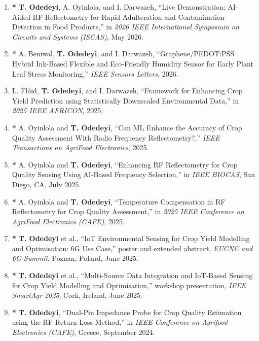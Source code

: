 \documentclass[a4paper,11pt]{article}
\begin{document}
\begin{enumerate}[leftmargin=*]

\item \textbf{*} \textbf{T. Odedeyi}, A. Oyinlola, and I. Darwazeh, ``Live Demonstration: AI-Aided RF Reflectometry for Rapid Adulteration and Contamination Detection in Food Products,'' in \emph{2026 IEEE International Symposium on Circuits and Systems (ISCAS)}, May 2026.

\item \textbf{*} A. Beniwal, \textbf{T. Odedeyi}, and I. Darwazeh, ``Graphene/PEDOT:PSS Hybrid Ink-Based Flexible and Eco-Friendly Humidity Sensor for Early Plant Leaf Stress Monitoring,'' \emph{IEEE Sensors Letters}, 2026.

\item L. Fl\'oid, \textbf{T. Odedeyi}, and I. Darwazeh, ``Framework for Enhancing Crop Yield Prediction using Statistically Downscaled Environmental Data,'' in \emph{2025 IEEE AFRICON}, 2025.

\item \textbf{*} A. Oyinlola and \textbf{T. Odedeyi}, ``Can ML Enhance the Accuracy of Crop Quality Assessment With Radio Frequency Reflectometry?,'' \emph{IEEE Transactions on AgriFood Electronics}, 2025.

\item \textbf{*} A. Oyinlola and \textbf{T. Odedeyi}, ``Enhancing RF Reflectometry for Crop Quality Sensing Using AI-Based Frequency Selection,'' in \emph{IEEE BIOCAS}, San Diego, CA, July 2025.

\item \textbf{*} A. Oyinlola and \textbf{T. Odedeyi}, ``Temperature Compensation in RF Reflectometry for Crop Quality Assessment,'' in \emph{2025 IEEE Conference on AgriFood Electronics (CAFE)}, 2025.

\item \textbf{*} \textbf{T. Odedeyi} et al., ``IoT Environmental Sensing for Crop Yield Modelling and Optimisation: 6G Use Case,'' poster and extended abstract, \emph{EUCNC and 6G Summit}, Poznan, Poland, June 2025.

\item \textbf{*} \textbf{T. Odedeyi} et al., ``Multi-Source Data Integration and IoT-Based Sensing for Crop Yield Modelling and Optimisation,'' workshop presentation, \emph{IEEE SmartAgr 2025}, Cork, Ireland, June 2025.

\item \textbf{*} \textbf{T. Odedeyi}, ``Dual-Pin Impedance Probe for Crop Quality Estimation using the RF Return Loss Method,'' in \emph{IEEE Conference on Agrifood Electronics (CAFE)}, Greece, September 2024.


\end{enumerate}
\end{document}
